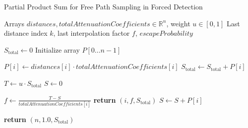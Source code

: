 \begin{algorithm}[!tp]
\caption{Partial Product Sum for Free Path Sampling in Forced Detection}
\label{alg:partialProductSum}
\begin{algorithmic}[1]
\Require Arrays $distances, totalAttenuationCoefficients \in \mathbb{R}^n$, weight $u \in [0, 1]$
\Ensure Last distance index $k$, last interpolation factor $f$,
$escapeProbability$

\State $S_\text{total} \gets 0$
\State Initialize array $P[0\ldots n-1]$

    \State $P[i] \gets distances[i] \cdot totalAttenuationCoefficients[i]$
    \State $S_\text{total} \gets S_\text{total} + P[i]$
\EndFor

\State $T \gets u \cdot S_\text{total}$
\State $S \gets 0$

        \State $f \gets \frac{T - S}{totalAttenuationCoefficients[i]}$
        \State \textbf{return} $(i, f, S_\text{total})$
    \EndIf
    \State $S \gets S + P[i]$
\EndFor

\State \textbf{return} $(n, 1.0, S_\text{total})$ 
\end{algorithmic}
\end{algorithm}


